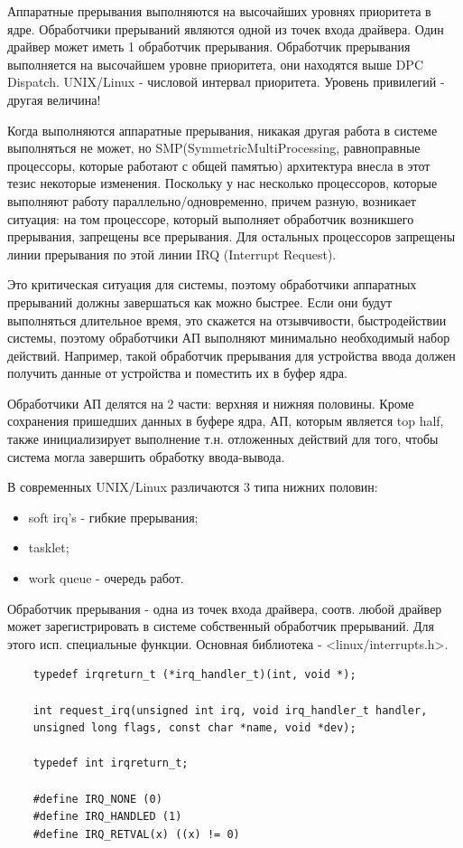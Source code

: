 \documentclass[12pt,a4paper]{scrreprt}
\begin{document}
Аппаратные прерывания выполняются на высочайших уровнях приоритета в ядре. Обработчики прерываний являются одной из точек входа драйвера. Один драйвер может иметь 1 обработчик прерывания. Обработчик прерывания выполняется на высочайшем уровне приоритета, они находятся выше DPC Dispatch. UNIX/Linux - числовой интервал приоритета. Уровень привилегий - другая величина!

Когда выполняются аппаратные прерывания, никакая другая работа в системе выполняться не может, но SMP(SymmetricMultiProcessing, равноправные процессоры, которые работают с общей памятью) архитектура внесла в этот тезис некоторые изменения. Поскольку у нас несколько процессоров, которые выполняют работу параллельно/одновременно, причем разную, возникает ситуация: на том процессоре, который выполняет обработчик возникшего прерывания, запрещены все прерывания. Для остальных процессоров запрещены линии прерывания по этой линии IRQ (Interrupt Request). 

Это критическая ситуация для системы, поэтому обработчики аппаратных прерываний должны завершаться как можно быстрее. Если они будут выполняться длительное время, это скажется на отзывчивости, быстродействии системы, поэтому обработчики АП выполняют минимально необходимый набор действий. Например, такой обработчик прерывания для устройства ввода должен получить данные от устройства и поместить их в буфер ядра. 

Обработчики АП делятся на 2 части: верхняя и нижняя половины. Кроме сохранения пришедших данных в буфере ядра, АП, которым является top half, также инициализирует выполнение т.н. отложенных действий для того, чтобы система могла завершить обработку ввода-вывода. 

В современных UNIX/Linux различаются 3 типа нижних половин: 

\begin{itemize}
	\item soft irq's - гибкие прерывания;
	\item tasklet;
	\item work queue - очередь работ.
\end{itemize}

Обработчик прерывания - одна из точек входа драйвера, соотв. любой драйвер может зарегистрировать в системе собственный обработчик прерываний. Для этого исп. специальные функции.
Основная библиотека - <linux/interrupts.h>.

\begin{lstlisting}
	typedef irqreturn_t (*irq_handler_t)(int, void *);
	
	int request_irq(unsigned int irq, void irq_handler_t handler, 
	unsigned long flags, const char *name, void *dev);
	
	typedef int irqreturn_t;
	
	#define IRQ_NONE (0)
	#define IRQ_HANDLED (1)
	#define IRQ_RETVAL(x) ((x) != 0)
\end{lstlisting}
\end{document}
